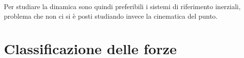 \documentclass[10pt,a4paper]{book}
\begin{document}
Per studiare la dinamica sono quindi preferibili i sistemi di riferimento inerziali, problema che non ci si è posti studiando invece la cinematica del punto.







































\section{Classificazione delle forze}
\end{document}
